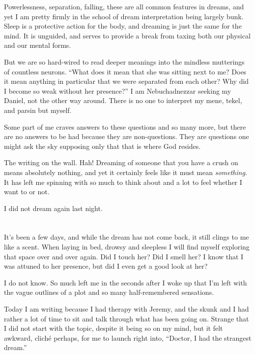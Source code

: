 Powerlessness, separation, falling, these are all common features in dreams, and yet I am pretty firmly in the school of dream interpretation being largely bunk. Sleep is a protective action for the body, and dreaming is just the same for the mind. It is unguided, and serves to provide a break from taxing both our physical and our mental forms.

But we are so hard-wired to read deeper meanings into the mindless mutterings of countless neurons. ``What does it mean that she was sitting next to me? Does it mean anything in particular that we were separated from each other? Why did I become so weak without her presence?'' I am Nebuchadnezzar seeking my Daniel, not the other way around. There is no one to interpret my mene, tekel, and parsin but myself.

Some part of me craves answers to these questions and so many more, but there are no answers to be had because they are non-questions. They are questions one might ask the sky supposing only that that is where God resides.

The writing on the wall. Hah! Dreaming of someone that you have a crush on means absolutely nothing, and yet it certainly feels like it must mean \emph{something.} It has left me spinning with so much to think about and a lot to feel whether I want to or not.

I did not dream again last night.

\section{}

It's been a few days, and while the dream has not come back, it still clings to me like a scent. When laying in bed, drowsy and sleepless I will find myself exploring that space over and over again. Did I touch her? Did I smell her? I know that I was attuned to her presence, but did I even get a good look at her?

I do not know. So much left me in the seconds after I woke up that I'm left with the vague outlines of a plot and so many half-remembered sensations.

Today I am writing because I had therapy with Jeremy, and the skunk and I had rather a lot of time to sit and talk through what has been going on. Strange that I did not start with the topic, despite it being so on my mind, but it felt awkward, cliché perhaps, for me to launch right into, ``Doctor, I had the strangest dream.''

